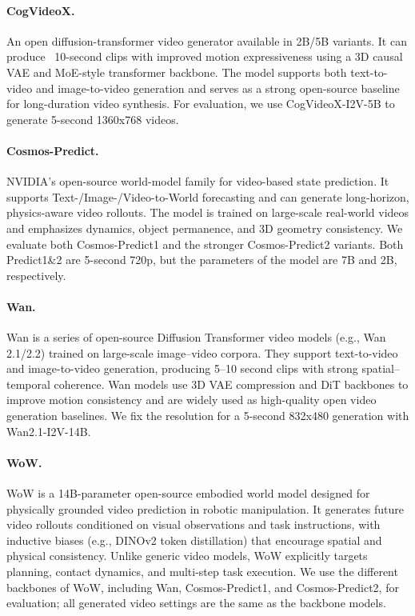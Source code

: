 \paragraph{CogVideoX.~\cite{yang2024cogvideox}}
An open diffusion-transformer video generator available in 2B/5B variants. It can produce ~10-second clips with improved motion expressiveness using a 3D causal VAE and MoE-style transformer backbone. The model supports both text-to-video and image-to-video generation and serves as a strong open-source baseline for long-duration video synthesis. For evaluation, we use CogVideoX-I2V-5B to generate 5-second 1360x768 videos.

\paragraph{Cosmos-Predict.~\cite{agarwal2025cosmos,cosmos2}}
NVIDIA’s open-source world-model family for video-based state prediction. It supports Text-/Image-/Video-to-World forecasting and can generate long-horizon, physics-aware video rollouts. The model is trained on large-scale real-world videos and emphasizes dynamics, object permanence, and 3D geometry consistency. We evaluate both Cosmos-Predict1 and the stronger Cosmos-Predict2 variants. Both Predict1\&2 are 5-second 720p, but the parameters of the model are 7B and 2B, respectively.

\paragraph{Wan.~\cite{wan2025wan}}
Wan is a series of open-source Diffusion Transformer video models (e.g., Wan 2.1/2.2) trained on large-scale image–video corpora. They support text-to-video and image-to-video generation, producing 5–10 second clips with strong spatial–temporal coherence. Wan models use 3D VAE compression and DiT backbones to improve motion consistency and are widely used as high-quality open video generation baselines. We fix the resolution for a 5-second 832x480 generation with Wan2.1-I2V-14B.

\paragraph{WoW.~\cite{chi2025wow}}
WoW is a 14B-parameter open-source embodied world model designed for physically grounded video prediction in robotic manipulation. It generates future video rollouts conditioned on visual observations and task instructions, with inductive biases (e.g., DINOv2 token distillation) that encourage spatial and physical consistency. Unlike generic video models, WoW explicitly targets planning, contact dynamics, and multi-step task execution. We use the different backbones of WoW, including Wan, Cosmos-Predict1, and Cosmos-Predict2, for evaluation; all generated video settings are the same as the backbone models.

